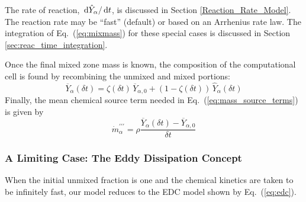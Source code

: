 The rate of reaction, $\,\mathrm{d} \hat{Y}_\alpha/\,\mathrm{d} t$, is discussed in Section \ref{Reaction_Rate_Model}. The reaction rate may be ``fast'' (default) or based on an Arrhenius rate law.  The integration of Eq.~(\ref{eq:mixmass}) for these special cases is discussed in Section \ref{sec:reac_time_integration}.

Once the final mixed zone mass is known, the composition of the computational cell is found by recombining the unmixed and mixed portions:
\begin{equation}
\label{eq:final_comp}
\overline{Y}_{\alpha}(\delta t)= \zeta(\delta t) \, \overline{Y}_{\alpha,0} + (1-\zeta(\delta t)) \, \hat{Y}_{\alpha}(\delta t)
\end{equation}
Finally, the mean chemical source term needed in Eq.~(\ref{eq:mass_source_terms}) is given by
\begin{equation}
\label{mass_prod_rate}
\dot{m}^{\prime\prime\prime}_{\alpha} = \rho \frac{\overline{Y}_{\alpha}(\delta t) - \overline{Y}_{\alpha,0}}{\delta t}
\end{equation}

\subsubsection{A Limiting Case: The Eddy Dissipation Concept}

When the initial unmixed fraction is one and the chemical kinetics are taken to be infinitely fast, our model reduces to the EDC model shown by Eq.~(\ref{eq:edc}).


